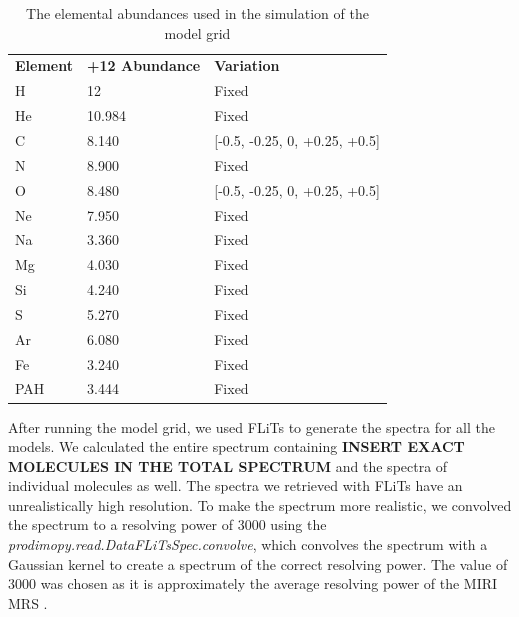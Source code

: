 \documentclass[twoside, single, authoryear, semicolon]{lion-msc}
\newcommand{\4}{$_4$}
\newcommand{\3}{$_3$}
\newcommand{\2}{$_2$}
\begin{document}
\begin{table}[!ht]
\centering
\begin{tabular}{@{}lll@{}}
                                  &                             &                            \\ \hline\midrule
\textbf{Element} & \textbf{+12 Abundance} & \textbf{Variation}            \\ \midrule
H                & 12                     & Fixed                         \\
He               & 10.984                 & Fixed                         \\
C                & 8.140                  & {[}-0.5, -0.25, 0, +0.25, +0.5{]} \\
N                & 8.900                  & Fixed                         \\
O                & 8.480                  & {[}-0.5, -0.25, 0, +0.25, +0.5{]} \\
Ne               & 7.950                  & Fixed                         \\
Na               & 3.360                  & Fixed                         \\
Mg               & 4.030                  & Fixed                         \\
Si               & 4.240                  & Fixed                         \\
S                & 5.270                  & Fixed                         \\
Ar               & 6.080                  & Fixed                         \\
Fe               & 3.240                  & Fixed                         \\
PAH              & 3.444                  & Fixed                         \\ \bottomrule
\end{tabular}
\caption{The elemental abundances used in the simulation of the model grid}
\label{tab: abundances}
\end{table}



After running the model grid, we used FLiTs to generate the spectra for all the models. We calculated the entire spectrum containing  \textbf{INSERT EXACT MOLECULES IN THE TOTAL SPECTRUM} and the spectra of individual molecules as well. The spectra we retrieved with FLiTs have an unrealistically high resolution. To make the spectrum more realistic, we convolved the spectrum to a resolving power of 3000 using the \textit{prodimopy.read.DataFLiTsSpec.convolve}\citep{SOURCE}, which convolves the spectrum with a Gaussian kernel to create a spectrum of the correct resolving power. The value of 3000 was chosen as it is approximately the average resolving power of the MIRI MRS \citep{SOURCE}. 
\end{document}
